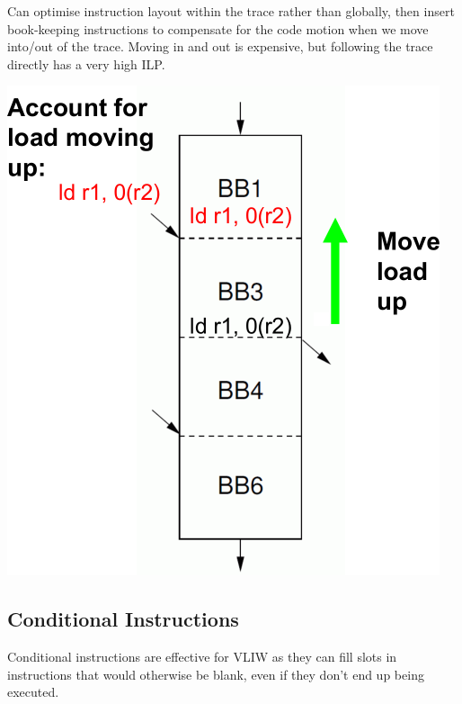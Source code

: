 \documentclass[a4paper,11pt]{article}
\begin{document}
{{{\begin{minipage}[t]{0.55\textwidth}
            Can optimise instruction layout within the trace rather than globally, then insert book-keeping instructions to compensate for the code motion when we move into/out of the trace. Moving in and out is expensive, but following the trace directly has a very high ILP.
            \end{minipage}
            \hspace{5mm}
            \begin{minipage}[t]{0.4\textwidth}
            \vspace{0pt}
            \centering
            \includegraphics[width=\textwidth]{trace-scheduling.png}
            \end{minipage}
        }
    }
    \subsection*{Conditional Instructions}
    {
        Conditional instructions are effective for VLIW as they can fill slots in instructions that would otherwise be blank, even if they don't end up being executed.
    }
}
\end{document}

